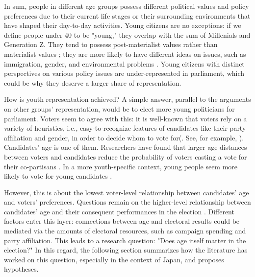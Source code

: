 \documentclass[a4paper, 12pt]{article}\usepackage[dvipdfmx]{graphicx}\usepackage[]{xcolor}
\begin{document}

In sum, people in different age groups possess different political values and policy preferences due to their current life stages or their surrounding environments that have shaped their day-to-day activities. Young citizens are no exceptions: if we define people under 40 to be "young," they overlap with the sum of Millenials and Generation Z. They tend to possess post-materialist values rather than materialist values \citep{inglehart2008changing}; they are more likely to have different ideas on issues, such as immigration, gender, and environmental problems \citep{dimock2019defining, webster2019older}. Young citizens with distinct perspectives on various policy issues are under-represented in parliament, which could be why they deserve a larger share of representation. 

How is youth representation achieved? A simple answer, parallel to the arguments on other groups' representation, would be to elect more young politicians for parliament. Voters seem to agree with this: it is well-known that voters rely on a variety of heuristics, i.e., easy-to-recognize features of candidates like their party affiliation and gender, in order to decide whom to vote for(\citet{fortunato2019heuristics}. See, for example, \citet{sanbonmatsu2002gender, shugart2005looking, coffe2021candidate}). Candidates' age is one of them. Researchers have found that larger age distances between voters and candidates reduce the probability of voters casting a vote for their co-partisans \citep{sevi2021young}. In a more youth-specific context, young people seem more likely to vote for young candidates \citep{webster2019older}. 

However, this is about the lowest voter-level relationship between candidates' age and voters' preferences. Questions remain on the higher-level relationship between candidates' age and their consequent performances in the election \footnotemark{}. Different factors enter this layer: connections between age and electoral results could be mediated via the amounts of electoral resources, such as campaign spending and party affiliation. This leads to a research question: "Does age itself matter in the election?" In this regard, the following section summarizes how the literature has worked on this question, especially in the context of Japan, and proposes hypotheses. 
\end{document}
